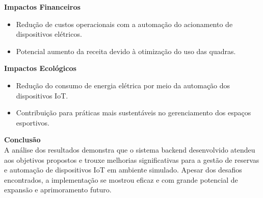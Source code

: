 \textbf{Impactos Financeiros}\\
\begin{itemize}
    \item Redução de custos operacionais com a automação do acionamento de dispositivos elétricos.
    \item Potencial aumento da receita devido à otimização do uso das quadras.
\end{itemize}

\textbf{Impactos Ecológicos}\\
\begin{itemize}
    \item Redução do consumo de energia elétrica por meio da automação dos dispositivos IoT.
    \item Contribuição para práticas mais sustentáveis no gerenciamento dos espaços esportivos.
\end{itemize}

\textbf{Conclusão}\\
A análise dos resultados demonstra que o sistema backend desenvolvido atendeu aos objetivos propostos e trouxe melhorias significativas para a gestão de reservas e automação de dispositivos IoT em ambiente simulado. Apesar dos desafios encontrados, a implementação se mostrou eficaz e com grande potencial de expansão e aprimoramento futuro.
